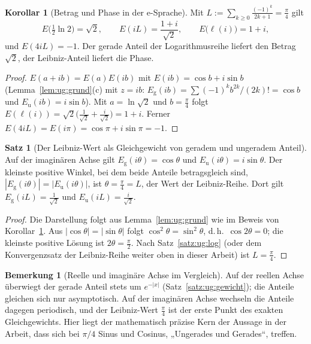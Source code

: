 \documentclass[a4paper,12pt,twoside]{report}
\theoremstyle{definition}
\newtheorem{satz}{Satz}
\newtheorem{korollar}{Korollar}
\newtheorem{bemerkung}{Bemerkung}
\begin{document}
\begin{korollar}[Betrag und Phase in der e-Sprache]\label{kor:ug:polar}
Mit $L:=\sum_{k\ge0}\frac{(-1)^k}{2k+1}=\frac\pi4$ gilt
\[
E\!\Big(\tfrac12\ln2\Big)=\sqrt2,\qquad E(iL)=\frac{1+i}{\sqrt2},\qquad E\big(\ell(i)\big)=1+i,
\]
und $E(4iL)=-1$. Der gerade Anteil der Logarithmusreihe liefert den Betrag $\sqrt2$, der Leibniz-Anteil liefert die Phase.
\end{korollar}

\begin{proof}
$E(a+ib)=E(a)E(ib)$ mit $E(ib)=\cos b+i\sin b$ (Lemma~\ref{lem:ug:grund}(c) mit $z=ib$: $E_{\mathrm g}(ib)=\sum(-1)^kb^{2k}/(2k)!=\cos b$ und $E_{\mathrm u}(ib)=i\sin b$). Mit $a=\ln\sqrt2$ und $b=\frac\pi4$ folgt $E(\ell(i))=\sqrt2\big(\tfrac1{\sqrt2}+\tfrac i{\sqrt2}\big)=1+i$. Ferner $E(4iL)=E(i\pi)=\cos\pi+i\sin\pi=-1$.
\end{proof}

\begin{satz}[Der Leibniz-Wert als Gleichgewicht von geradem und ungeradem Anteil]\label{satz:ug:gleichg}
Auf der imaginären Achse gilt $E_{\mathrm g}(i\theta)=\cos\theta$ und $E_{\mathrm u}(i\theta)=i\sin\theta$. Der kleinste positive Winkel, bei dem beide Anteile betragsgleich sind, $|E_{\mathrm g}(i\theta)|=|E_{\mathrm u}(i\theta)|$, ist $\theta=\frac\pi4=L$, der Wert der Leibniz-Reihe. Dort gilt $E_{\mathrm g}(iL)=\frac1{\sqrt2}$ und $E_{\mathrm u}(iL)=\frac{i}{\sqrt2}$.
\end{satz}

\begin{proof}
Die Darstellung folgt aus Lemma~\ref{lem:ug:grund} wie im Beweis von Korollar~\ref{kor:ug:polar}. Aus $|\cos\theta|=|\sin\theta|$ folgt $\cos^2\theta=\sin^2\theta$, d.\,h.\ $\cos2\theta=0$; die kleinste positive Lösung ist $2\theta=\frac\pi2$. Nach Satz~\ref{satz:ug:log} (oder dem Konvergenzsatz der Leibniz-Reihe weiter oben in dieser Arbeit) ist $L=\frac\pi4$.
\end{proof}

\begin{bemerkung}[Reelle und imaginäre Achse im Vergleich]
Auf der reellen Achse überwiegt der gerade Anteil stets um $e^{-|x|}$ (Satz~\ref{satz:ug:gewicht}); die Anteile gleichen sich nur asymptotisch. Auf der imaginären Achse wechseln die Anteile dagegen periodisch, und der Leibniz-Wert $\frac\pi4$ ist der erste Punkt des exakten Gleichgewichts. Hier liegt der mathematisch präzise Kern der Aussage in der Arbeit, dass sich bei $\pi/4$ Sinus und Cosinus, „Ungerades und Gerades“, treffen.
\end{bemerkung}
\end{document}
